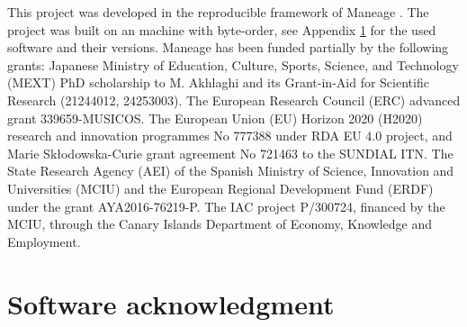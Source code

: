 \documentclass[10pt, twocolumn]{article}
\begin{document}
This project was developed in the reproducible framework of Maneage \citep[\emph{Man}aging data lin\emph{eage},][latest Maneage commit \maneageversion{}, from \maneagedate]{maneage}.
The project was built on an {\machinearchitecture} machine with {\machinebyteorder} byte-order, see Appendix \ref{appendix:software} for the used software and their versions.
Maneage has been funded partially by the following grants: Japanese Ministry of Education, Culture, Sports, Science, and Technology (MEXT) PhD scholarship to M. Akhlaghi and its Grant-in-Aid for Scientific Research (21244012, 24253003).
The European Research Council (ERC) advanced grant 339659-MUSICOS.
The European Union (EU) Horizon 2020 (H2020) research and innovation programmes No 777388 under RDA EU 4.0 project, and Marie Sk\l{}odowska-Curie grant agreement No 721463 to the SUNDIAL ITN.
The State Research Agency (AEI) of the Spanish Ministry of Science, Innovation and Universities (MCIU) and the European Regional Development Fund (ERDF) under the grant AYA2016-76219-P.
The IAC project P/300724, financed by the MCIU, through the Canary Islands Department of Economy, Knowledge and Employment.

\printbibliography

\appendix

\section{Software acknowledgment}
\label{appendix:software}


\end{document}

